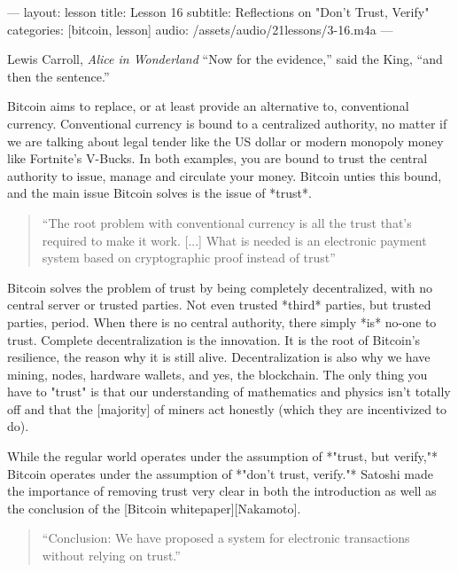 ---
layout: lesson
title: Lesson 16
subtitle: Reflections on "Don't Trust, Verify"
categories: [bitcoin, lesson]
audio: /assets/audio/21lessons/3-16.m4a
---

\label{les:16}

\begin{chapquote}{Lewis Carroll, \textit{Alice in Wonderland}}
``Now for the evidence,'' said the King, ``and then the sentence.''
\end{chapquote}

Bitcoin aims to replace, or at least provide an alternative to,
conventional currency. Conventional currency is bound to a centralized
authority, no matter if we are talking about legal tender like the US
dollar or modern monopoly money like Fortnite's V-Bucks. In both
examples, you are bound to trust the central authority to issue, manage
and circulate your money. Bitcoin unties this bound, and the main issue
Bitcoin solves is the issue of *trust*.

\begin{quotation}
``The root problem with conventional currency is all the trust that's
required to make it work. [...] What is needed is an electronic
payment system based on cryptographic proof instead of trust''
\end{quotation}

Bitcoin solves the problem of trust by being completely decentralized,
with no central server or trusted parties. Not even trusted *third*
parties, but trusted parties, period. When there is no central
authority, there simply *is* no-one to trust. Complete decentralization
is the innovation. It is the root of Bitcoin's resilience, the reason
why it is still alive. Decentralization is also why we have mining,
nodes, hardware wallets, and yes, the blockchain. The only thing you
have to "trust" is that our understanding of mathematics and physics
isn't totally off and that the [majority] of miners act honestly (which
they are incentivized to do).

While the regular world operates under the assumption of *"trust, but
verify,"* Bitcoin operates under the assumption of *"don't trust,
verify."* Satoshi made the importance of removing trust very clear in
both the introduction as well as the conclusion of the [Bitcoin
whitepaper][Nakamoto].

\begin{quotation}
``Conclusion: We have proposed a system for electronic transactions
without relying on trust.''
\end{quotation}

